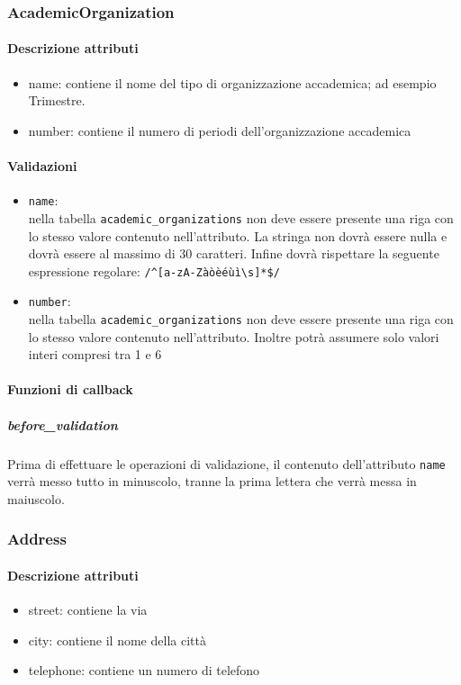 \documentclass[11pt,a4paper]{article}
\begin{document}
\subsubsection{AcademicOrganization}
\paragraph{Descrizione attributi}
\begin{itemize}
 \item name: contiene il nome del tipo di organizzazione accademica; ad esempio Trimestre.
 \item number: contiene il numero di periodi dell'organizzazione accademica
\end{itemize}

\paragraph{Validazioni}
\begin{itemize}
 \item \verb|name|:\\ nella tabella \verb|academic_organizations| non deve essere presente una riga con lo stesso valore contenuto nell'attributo. La stringa non dovrà essere nulla e dovrà essere al massimo di 30 caratteri. Infine dovrà rispettare la seguente espressione regolare: \verb|/^[a-zA-Zàòèéùì\s]*$/|
\item \verb|number|:\\ nella tabella \verb|academic_organizations| non deve essere presente una riga con lo stesso valore contenuto nell'attributo. Inoltre potrà assumere solo valori interi compresi tra 1 e 6
\end{itemize}
\paragraph{Funzioni di callback}
\subparagraph{before\_validation}
Prima di effettuare le operazioni di validazione, il contenuto dell'attributo \verb|name| verrà messo tutto in minuscolo, tranne la prima lettera che verrà messa in maiuscolo. 
\subsubsection{Address}
\paragraph{Descrizione attributi}
\begin{itemize}
 \item street: contiene la via  
 \item city: contiene il nome della città
 \item telephone: contiene un numero di telefono
\end{itemize}
\end{document}
